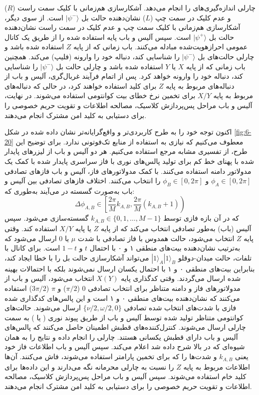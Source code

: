 چارلی اندازه‌گیری‌های  را انجام می‌دهد. آشکارسازی هم‌زمانی با کلیک  سمت راست ($R$) و عدم کلیک در  سمت چپ ($L$) نشان‌دهنده حالت بل $|\psi^-\rangle$ است. از سوی دیگر، آشکارسازی هم‌زمانی با کلیک  سمت چپ و عدم کلیک در  سمت راست نشان‌دهنده حالت بل $|\psi^+\rangle$ است. سپس آلیس و باب پایه استفاده شده را از طریق یک کانال عمومی احرازهویت‌شده مبادله می‌کنند. باب زمانی که از پایه $Z$ استفاده شده باشد و چارلی حالت‌های بل $|\psi^-\rangle$ را شناسایی کند، دنباله خود را وارونه (فلیپ) می‌کند. همچنین باب زمانی که از پایه $X$ یا $Y$ استفاده شده باشد و چارلی حالت بل $|\psi^-\rangle$ را شناسایی کند، دنباله خود را وارونه خواهد کرد. پس از اتمام فرآیند غربال‌گری، آلیس و باب از دنباله‌های مربوط به پایه $Z$ برای کلید استفاده خواهند کرد، در حالی که دنباله‌های مربوط به پایه $X/Y$ برای تخمین نرخ خطای بیت کوانتومی استفاده می‌شوند. در نهایت، آلیس و باب مراحل پس‌پردازش کلاسیک، مصالحه اطلاعات و تقویت حریم خصوصی را برای دستیابی به کلید امن مشترک انجام می‌دهند.

اکنون توجه خود را به طرح کاربردی‌تر و واقع‌گرایانه‌تر  نشان داده شده در شکل \ref{fig:6-20} معطوف می‌کنیم که نیازی به استفاده از منابع تک‌فوتونی ندارد. برای توضیح این طرح، از تفسیری مشابه مرجع \cite{104} استفاده می‌کنیم. هر دو آلیس و باب از لیزرهای  پایدار شده با پهنای خط کم برای تولید پالس‌های نوری با فاز سراسری پایدار شده با کمک یک مدولاتور دامنه استفاده می‌کنند. با کمک مدولاتورهای فاز، آلیس و باب فازهای تصادفی $\phi_A \in [0, 2\pi]$ و $\phi_B \in [0, 2\pi]$ را انتخاب می‌کنند. اختلاف فازهای تصادفی بین آلیس و باب به‌صورت گسسته در می‌آیند به‌طوری که:
\begin{equation}
	\Delta\phi_{A,B} \in \left[ \frac{2\pi}{M}k_{A,B}, \frac{2\pi}{M}(k_{A,B} + 1) \right)
	\label{eq:6-51}
\end{equation}
که در آن بازه فازی توسط $k_{A,B} \in \{0, 1, \dots, M-1\}$ گسسته‌سازی می‌شود. سپس آلیس (باب) به‌طور تصادفی انتخاب می‌کند که از پایه $Z$ یا پایه $X/Y$ استفاده کند. وقتی پایه $Z$ انتخاب می‌شود، حالت همدوس با فاز تصادفی با شدت $\mu$ یا $0$ ارسال می‌شود که به‌ترتیب نشان‌دهنده بیت‌های منطقی ۱ و ۰ با احتمال $t$ و $1-t$ است. برای کانال با تلفات، حالت میدان-دوقلو $|1\rangle_A |1\rangle_B$ می‌تواند آشکارسازی حالت بل را با خطا ایجاد کند، بنابراین بیت‌های منطقی ۰ و ۱ با احتمال یکسان ارسال نمی‌شوند بلکه با احتمالات بهینه شده ارسال می‌گردند. وقتی کدگذاری پایه $X(Y)$ انتخاب می‌شود، آلیس و باب از مدولاتورهای فاز و دامنه متناظر برای انتخاب تصادفی $0$ ($\pi/2$) و $\pi$ ($3\pi/2$) استفاده می‌کنند که نشان‌دهنده بیت‌های منطقی ۰ و ۱ است و این پالس‌های کدگذاری شده فازی با شدت‌های انتخاب شده تصادفی $\{ \nu/2, \omega/2, 0 \}$ ارسال می‌شوند. حالت‌های کوانتومی متناظر تولید شده توسط آلیس و باب از طریق پیوند نوری ( یا ) به سمت چارلی ارسال می‌شوند. کنترل‌کننده‌های قطبش اطمینان حاصل می‌کنند که پالس‌های آلیس و باب دارای قطبش یکسانی هستند. چارلی  را انجام داده و نتایج را به همان شیوه‌ای که در بالا شرح داده شد اعلام می‌کند. سپس آلیس و باب اطلاعات فاز خود یعنی $k_{A,B}$ و شدت‌ها را که برای تخمین پارامتر استفاده می‌شوند، فاش می‌کنند. آن‌ها اطلاعات مربوط به پایه $Z$ را نسبت به چارلی محرمانه نگه می‌دارند و این داده‌ها برای کلید خام استفاده می‌شوند. سپس آلیس و باب مراحل پس‌پردازش کلاسیک، مصالحه اطلاعات و تقویت حریم خصوصی را برای دستیابی به کلید امن مشترک انجام می‌دهند.

